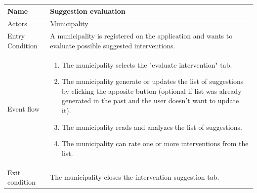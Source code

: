 \vskip 0.2in
\begin{tabular}{|p{3.1cm}|p{11.6cm}|}
\hline
Name & Suggestion evaluation\\
\hline
Actors & Municipality\\
\hline
Entry Condition & A municipality is registered on the application and wants to evaluate possible suggested interventions.\\
\hline
Event flow & \begin{enumerate}
			\item The municipality selects the "evaluate intervention" tab.
			\item The municipality generate or updates the list of suggestions by clicking the apposite button (optional if list was already generated in the past and the user doesn't want to update it).
			\item The municipality reads and analyzes the list of suggestions.
			\item The municipality can rate one or more interventions from the list.
            \end{enumerate}\\
\hline
Exit condition & The municipality closes the intervention suggestion tab.\\
\hline
\end{tabular}

